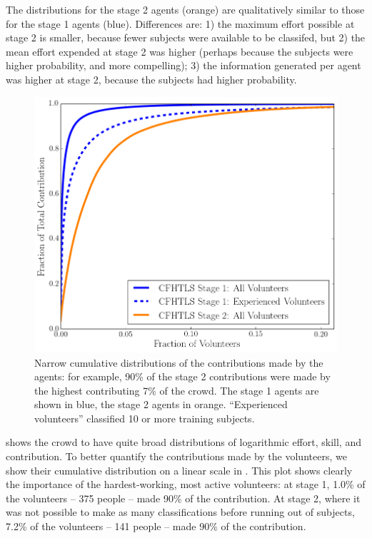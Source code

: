 \documentclass[useAMS,usenatbib,a4paper]{mn2e}
\begin{document}
The distributions for the stage 2 agents (orange) are qualitatively similar to
those for the stage 1 agents (blue). Differences are: 1) the maximum effort
possible at stage 2 is smaller, because fewer subjects were available to be
classifed, but 2) the mean effort expended at stage 2 was higher (perhaps
because the subjects were higher probability, and more compelling); 3) the
information generated per agent was higher at stage 2, because the subjects
had higher probability.

\begin{figure}
\centering\includegraphics[width=0.9\linewidth]{sw-system-figs/crowd_contrib_cumul.png}
\caption{Narrow cumulative distributions of the contributions made by the
agents: for example, 90\% of the stage 2 contributions were made by the
highest contributing  7\% of the crowd. The stage 1 agents are shown in blue,
the stage 2 agents in orange. ``Experienced volunteers'' classified 10 or more
training subjects.}
\label{fig:crowd:cumulplot}
\end{figure}

 shows the \sw crowd to have quite broad
distributions of logarithmic effort, skill, and contribution. To better
quantify the contributions made by the volunteers, we show their cumulative
distribution on a linear scale in . This plot shows
clearly the importance of the hardest-working, most active volunteers: at
stage 1,  1.0\% of the volunteers -- 375 people -- made 90\% of the
contribution.  At stage 2, where it was not possible to make as
many classifications before running out of subjects, 7.2\% of the volunteers
-- 141 people -- made 90\% of the contribution. 
\end{document}
